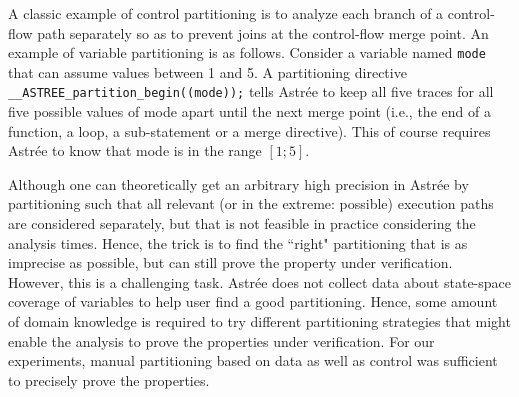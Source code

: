 A classic example of control partitioning is to analyze each branch of a 
control-flow path separately so as to prevent joins at the control-flow merge 
point.  An example of variable partitioning is as follows. Consider a variable 
named \texttt{mode} that can assume values between 1 and 5.  A partitioning directive 
\texttt{\_\_ASTREE\_partition\_begin((mode));} tells Astr{\'e}e to keep all 
five traces for all five possible values of mode apart 
until the next merge point (i.e., the end of a function, a loop, a sub-statement 
or a merge directive). This of course requires Astr{\'e}e to know that mode is 
in the range $[1;5]$.


Although one can theoretically get an arbitrary high precision in Astr{\'e}e by 
partitioning such that all relevant (or in the extreme: possible) execution 
paths are considered separately, but that is not feasible in practice considering 
the analysis times. Hence, the trick is to find the ``right" partitioning that 
is as imprecise as possible, but can still prove the property under verification.  
However, this is a challenging task.  Astr{\'e}e does not collect data about 
state-space coverage of variables to help user find a good partitioning.  Hence, 
some amount of domain knowledge is required to try different partitioning 
strategies that might enable the analysis to prove the properties under verification. 
For our experiments, manual partitioning based on data as well as control was sufficient 
to precisely prove the properties. 








